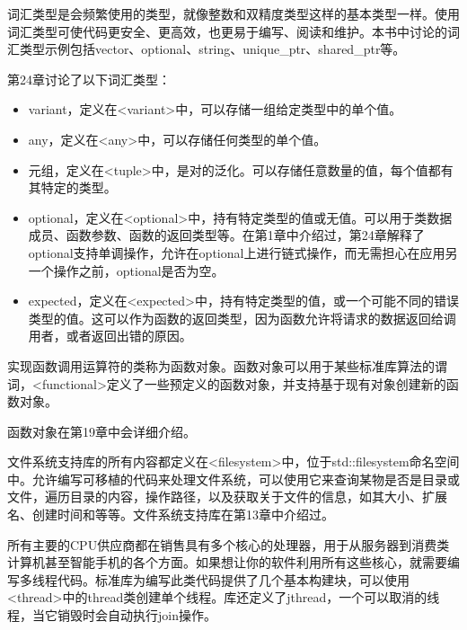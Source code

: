 
词汇类型是会频繁使用的类型，就像整数和双精度类型这样的基本类型一样。使用词汇类型可使代码更安全、更高效，也更易于编写、阅读和维护。本书中讨论的词汇类型示例包括vector、optional、string、unique\_ptr、shared\_ptr等。

第24章讨论了以下词汇类型：

\begin{itemize}
\item
variant，定义在<variant>中，可以存储一组给定类型中的单个值。

\item
any，定义在<any>中，可以存储任何类型的单个值。

\item
元组，定义在<tuple>中，是对的泛化。可以存储任意数量的值，每个值都有其特定的类型。

\item
optional，定义在<optional>中，持有特定类型的值或无值。可以用于类数据成员、函数参数、函数的返回类型等。在第1章中介绍过，第24章解释了optional支持单调操作，允许在optional上进行链式操作，而无需担心在应用另一个操作之前，optional是否为空。

\item
expected，定义在<expected>中，持有特定类型的值，或一个可能不同的错误类型的值。这可以作为函数的返回类型，因为函数允许将请求的数据返回给调用者，或者返回出错的原因。
\end{itemize}



实现函数调用运算符的类称为函数对象。函数对象可以用于某些标准库算法的谓词，<functional>定义了一些预定义的函数对象，并支持基于现有对象创建新的函数对象。

函数对象在第19章中会详细介绍。


文件系统支持库的所有内容都定义在<filesystem>中，位于std::filesystem命名空间中。允许编写可移植的代码来处理文件系统，可以使用它来查询某物是否是目录或文件，遍历目录的内容，操作路径，以及获取关于文件的信息，如其大小、扩展名、创建时间和等等。文件系统支持库在第13章中介绍过。


所有主要的CPU供应商都在销售具有多个核心的处理器，用于从服务器到消费类计算机甚至智能手机的各个方面。如果想让你的软件利用所有这些核心，就需要编写多线程代码。标准库为编写此类代码提供了几个基本构建块，可以使用<thread>中的thread类创建单个线程。库还定义了jthread，一个可以取消的线程，当它销毁时会自动执行join操作。

